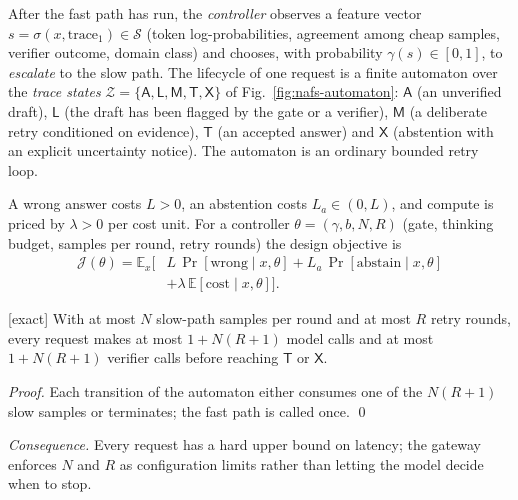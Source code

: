 \begin{definition}
After the fast path has run, the \emph{controller} observes a feature vector $s=\sigma(x,\text{trace}_1)\in\mathcal S$
(token log-probabilities, agreement among cheap samples, verifier outcome,
domain class) and chooses, with probability $\gamma(s)\in[0,1]$, to
\emph{escalate} to the slow path. The lifecycle of one request is a finite
automaton over the \emph{trace states}
$\mathcal Z=\{\mathsf{A},\mathsf{L},\mathsf{M},\mathsf{T},\mathsf{X}\}$ of
Fig.~\ref{fig:nafs-automaton}: $\mathsf A$ (an unverified draft),
$\mathsf L$ (the draft has been flagged by the gate or a verifier),
$\mathsf M$ (a deliberate retry conditioned on evidence), $\mathsf T$ (an
accepted answer) and $\mathsf X$ (abstention with an explicit uncertainty
notice). The automaton is an ordinary bounded retry loop.
\end{definition}

\begin{definition}
A wrong answer costs $L>0$, an abstention costs $L_a\in(0,L)$, and compute is
priced by $\lambda>0$ per cost unit. For a controller
$\theta=(\gamma,b,N,R)$ (gate, thinking budget, samples per round, retry
rounds) the design objective is
\begin{equation}
\label{eq:objective}
\begin{split}
\mathcal J(\theta)=\mathbb E_x\big[&L\,\Pr[\text{wrong}\mid x,\theta]
+L_a\,\Pr[\text{abstain}\mid x,\theta]\\
&+\lambda\,\mathbb E[\text{cost}\mid x,\theta]\big].
\end{split}
\end{equation}
\end{definition}

\begin{lemma}[Termination] \textnormal{[exact]}
\label{lem:termination}
With at most $N$ slow-path samples per round and at most $R$ retry rounds, every
request makes at most $1+N(R{+}1)$ model calls and at most $1+N(R{+}1)$
verifier calls before reaching $\mathsf T$ or $\mathsf X$.
\end{lemma}
\begin{proof}
Each transition of the automaton either consumes one of the $N(R{+}1)$ slow
samples or terminates; the fast path is called once. \qed
\end{proof}
\emph{Consequence.} Every request has a hard upper bound on latency; the
gateway enforces $N$ and $R$ as configuration limits rather than letting the
model decide when to stop.

